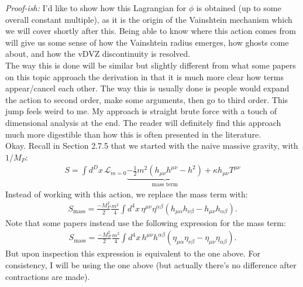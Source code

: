 \documentclass{book}
\theoremstyle{definition}
\newcommand{\lag}{\mathcal{L}}
\newcommand{\al}{\alpha}
\newcommand{\be}{\beta}
\newcommand{\f}[2]{\frac{#1}{#2}}
\newcommand{\lp}{\left(}
\newcommand{\rp}{\right)}
\begin{document}
\begin{framed}
	\textit{Proof-ish:} I'd like to show how this Lagrangian for $\phi$ is obtained (up to some overall constant multiple), as it is the origin of the Vainshtein mechanism which we will cover shortly after this. Being able to know where this action comes from will give us some sense of how the Vainshtein radius emerges, how ghosts come about, and how the vDVZ discontinuity is resolved. \\
	
	The way this is done will be similar but slightly different from what some papers on this topic approach the derivation in that it is much more clear how terms appear/cancel each other. The way this is usually done is people would expand the action to second order, make some arguments, then go to third order. This jump feels weird to me. My approach is straight brute force with a touch of dimensional analysis at the end. The reader will definitely find this approach much more digestible than how this is often presented in the literature. \\
	
	Okay. Recall in Section 2.7.5 that we started with the naive massive gravity, with $1/M_P$:
	\begin{align}
	S = \int d^Dx\, \lag_{m=0} \underbrace{ - \f{1}{2}m^2\lp h_{\mu\nu}h^{\mu\nu} - h^2 \rp}_{\text{mass term}} + \kappa h_{\mu\nu}T^{\mu\nu}
	\end{align}
	Instead of working with this action, we replace the mass term with:
	\begin{align}
	S_\text{mass} = \f{-M_P^2}{2}\f{m^2}{4}\int d^4x\, \eta^{\mu\nu}\eta^{\al\be}\lp h_{\mu\al}h_{\nu\be} - h_{\mu\nu}h_{\al\be} \rp.
	\end{align}
	Note that some papers instead use the following expression for the mass term:
	\begin{align}
	S_\text{mass} = \f{-M_P^2}{2}\f{m^2}{4}\int d^4x\, h^{\mu\nu}h^{\al\be}\lp \eta_{\mu\al}\eta_{\nu\be} - \eta_{\mu\nu}\eta_{\al\be} \rp.
	\end{align}	
	But upon inspection this expression is equivalent to the one above. For consistency, I will be using the one above (but actually there's no difference after contractions are made).\\
	

\end{framed}
\end{document}
